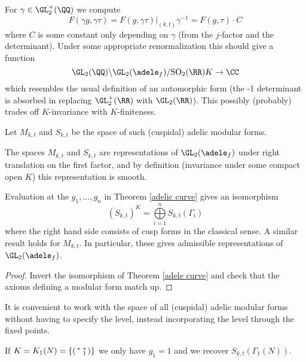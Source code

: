 \begin{rem}
    For $\gamma \in \GL_2^+(\QQ)$ we compute $$F(\gamma g, \gamma \tau) = F(g,\gamma\tau)|_{(k,t)}\gamma^{-1} = F(g,\tau) \cdot C$$ where $C$ is some constant only depending on $\gamma$ (from the $j$-factor and the determinant). Under some appropriate renormalization this should give a function
    $$\GL_2(\QQ) \backslash \GL_2(\adele_f)/\mathrm{SO}_2(\RR)K \to \CC$$ which resembles the usual definition of an automorphic form (the -1 determinant is absorbed in replacing $\GL_2^+(\RR)$ with $\GL_2(\RR)$). This possibly (probably) trades off $K$-invariance with $K$-finiteness.
\end{rem}
\begin{notn}
    Let $M_{k,t}$ and $S_{k,t}$ be the space of such (cuspidal) adelic modular forms.
\end{notn}
The spaces $M_{k,t}$ and $S_{k,t}$ are representations of $\GL_2(\adele_f)$ under right translation on the first factor, and by definition (invariance under some compact open $K$) this representation is smooth.

\begin{prop}
    Evaluation at the $g_1,\dots,g_n$ in Theorem \ref{adelic curve} gives an isomorphism 
    $$(S_{k,t})^K = \bigoplus\limits_{i=1}^n S_{k,t}(\Gamma_i)$$
    where the right hand side consists of cusp forms in the classical sense. A similar result holds for $M_{k,t}$. In particular, these gives admissible representations of $\GL_2(\adele_f)$.
\end{prop}
\begin{proof}
    Invert the isomorphism of Theorem \ref{adele curve} and check that the axioms defining a modular form match up.
\end{proof}

\begin{rem}
    It is convenient to work with the space of all (cuspidal) adelic modular forms without having to specify the level, instead incorporating the level through the fixed points.
\end{rem}
\begin{example}
    If $K=K_1(N) = \left\{\begin{psmallmatrix}
        * & * \\ & 1
    \end{psmallmatrix}\right\}$ we only have $g_1=1$ and we recover $S_{k,t}(\Gamma_1(N))$.
\end{example}
